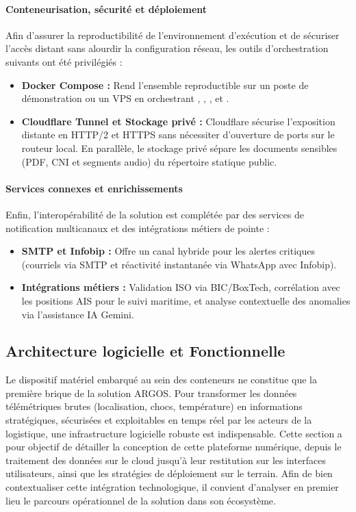 \paragraph{Conteneurisation, sécurité et déploiement}
Afin d'assurer la reproductibilité de l'environnement d'exécution et de sécuriser l'accès distant sans alourdir la configuration réseau, les outils d'orchestration suivants ont été privilégiés :
\begin{itemize}
    \item \textbf{Docker Compose :} Rend l'ensemble reproductible sur un poste de démonstration ou un VPS en orchestrant , , ,  et .
    \item \textbf{Cloudflare Tunnel et Stockage privé :} Cloudflare sécurise l'exposition distante en HTTP/2 et HTTPS sans nécessiter d'ouverture de ports sur le routeur local. En parallèle, le stockage privé sépare les documents sensibles (PDF, CNI et segments audio) du répertoire statique public.
\end{itemize}

\paragraph{Services connexes et enrichissements}
Enfin, l'interopérabilité de la solution est complétée par des services de notification multicanaux et des intégrations métiers de pointe :
\begin{itemize}
    \item \textbf{SMTP et Infobip :} Offre un canal hybride pour les alertes critiques (courriels via SMTP et réactivité instantanée via WhatsApp avec Infobip).
    \item \textbf{Intégrations métiers :} Validation ISO via BIC/BoxTech, corrélation avec les positions AIS pour le suivi maritime, et analyse contextuelle des anomalies via l'assistance IA Gemini.
\end{itemize}

\par\vspace{0.5cm}

\subsection{Architecture logicielle et Fonctionnelle}

Le dispositif matériel embarqué au sein des conteneurs ne constitue que la première brique de la solution ARGOS. Pour transformer les données télémétriques brutes (localisation, chocs, température) en informations stratégiques, sécurisées et exploitables en temps réel par les acteurs de la logistique, une infrastructure logicielle robuste est indispensable. Cette section a pour objectif de détailler la conception de cette plateforme numérique, depuis le traitement des données sur le cloud jusqu'à leur restitution sur les interfaces utilisateurs, ainsi que les stratégies de déploiement sur le terrain. Afin de bien contextualiser cette intégration technologique, il convient d'analyser en premier lieu le parcours opérationnel de la solution dans son écosystème.


